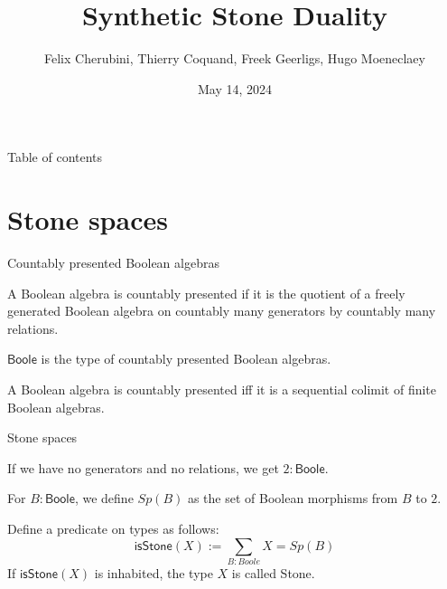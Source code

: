 \documentclass{beamer}
\newcommand{\Boole}{\mathsf{Boole}}
\newcommand{\isSt}{\mathsf{isStone}}
\newtheorem{remark}{Remark}
\begin{document}
\title{Synthetic Stone Duality}
\date{May 14, 2024}
\author{
Felix Cherubini, Thierry Coquand, Freek Geerligs, Hugo Moeneclaey}
\maketitle
\begin{frame}{Table of contents}
\tableofcontents
\end{frame}


  \section{Stone spaces}%
\begin{frame}{Countably presented Boolean algebras}
  \begin{definition}
    A Boolean algebra is countably presented if it is the quotient of 
    a freely generated Boolean algebra on countably many generators
    by countably many relations. 
  \end{definition}
  \pause
  \begin{definition}
    $\Boole$ is the type of countably presented Boolean algebras. 
  \end{definition}
  \pause
  \begin{lemma}
    A Boolean algebra is countably presented iff 
    it is a sequential colimit of finite Boolean algebras. 
%
  \end{lemma}
\end{frame}

\begin{frame}{Stone spaces}
  \begin{example}
    If we have no generators and no relations, we get $2:\Boole$.
  \end{example}
  \pause
\begin{definition}
  For $B:\Boole$, we define $Sp(B)$ as the set of Boolean morphisms from $B$ to $2$. 
\end{definition}
\pause
\begin{definition}
  Define a predicate on types as follows:
  \begin{equation*}
    \isSt(X) := \sum\limits_{B : Boole} X = Sp(B)
  \end{equation*} 
  If $\isSt(X)$ is inhabited, the type $X$ is called Stone.
\end{definition}
\end{frame}
\end{document}
